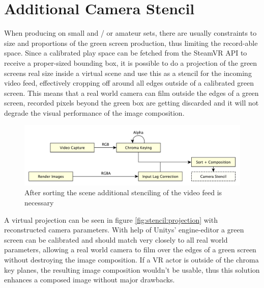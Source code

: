 %
\section{Additional Camera Stencil}

When producing on small and / or amateur sets, there are usually constraints to 
size and proportions of the green screen production, thus limiting the 
record-able space. Since a calibrated play space can be fetched from the 
SteamVR API to receive a proper-sized bounding box, it is possible to do a 
projection of the green screens real size inside a virtual scene and use this 
as a stencil for the incoming video feed, effectively cropping off around all 
edges outside of a calibrated green screen. This means that a real world camera 
can film outside the edges of a green screen, recorded pixels beyond the green 
box are getting discarded and it will not degrade the visual performance of the 
image composition.

\begin{figure}[htb]
	\includegraphics[width=\textwidth]{_raw_resources/pipeline_steps/4_6_stencil.pdf}
	\caption{After sorting the scene additional stenciling of the video feed is 
	necessary}
	\label{fig:steps:stencil}
\end{figure}

A virtual projection can be seen in figure \ref{fig:stencil:projection} with 
reconstructed camera parameters. With help of Unitys' engine-editor a 
green screen can be calibrated and should match very closely to all real world 
parameters, allowing a real world camera to film over the edges of a 
green screen without destroying the image composition. If a VR actor is outside 
of the chroma key planes, the resulting image composition wouldn't be usable, 
thus this solution enhances a composed image without major 
drawbacks.


